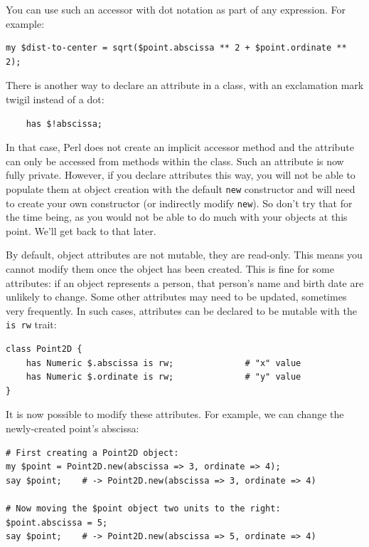 You can use such an accessor with dot notation as part of any 
expression. For example:

\begin{verbatim}
my $dist-to-center = sqrt($point.abscissa ** 2 + $point.ordinate ** 2);
\end{verbatim}
%

There is another way to declare an attribute in a class, with 
an exclamation mark twigil instead of a dot:

\begin{verbatim}
    has $!abscissa;  
\end{verbatim}
%
In that case, Perl does not create an implicit accessor method 
and the attribute can only be accessed from methods within 
the class. Such an attribute is now fully private. 
However, if you declare attributes this way, you 
will not be able to populate them at object creation with 
the default {\tt new} constructor and will need to create your 
own constructor (or indirectly modify {\tt new}). So don't try 
that for the time being, as you would not be able to do much 
with your objects at this point. We'll get back to that later.

By default, object attributes are not mutable, they are read-only. 
This means you cannot modify them once the object has been created. 
This is fine for some attributes: if an object represents a 
person, that person's name and birth date are unlikely to 
change. Some other attributes may need to be updated, sometimes 
very frequently. In such cases, attributes can be declared 
to be mutable with the {\tt is rw} trait:

\begin{verbatim}
class Point2D {
    has Numeric $.abscissa is rw;              # "x" value
    has Numeric $.ordinate is rw;              # "y" value
}
\end{verbatim}
%
It is now possible to modify these attributes. For example, 
we can change the newly-created point's abscissa:

\begin{verbatim}
# First creating a Point2D object:
my $point = Point2D.new(abscissa => 3, ordinate => 4);
say $point;    # -> Point2D.new(abscissa => 3, ordinate => 4)

# Now moving the $point object two units to the right:
$point.abscissa = 5; 
say $point;    # -> Point2D.new(abscissa => 5, ordinate => 4)
\end{verbatim}


